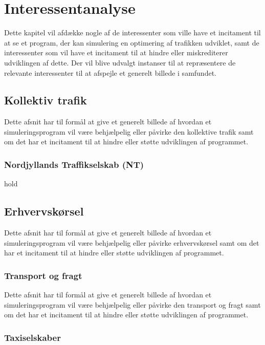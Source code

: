
\chapter{Interessentanalyse}

Dette kapitel vil afdække nogle af de interessenter som ville have et incitament til at se et program, der kan simulering en optimering af trafikken udviklet, samt de interessenter som vil have et incitament til at hindre eller miskrediterer udviklingen af dette. Der vil blive udvalgt instanser til at repræsentere de relevante interessenter til at afspejle et generelt billede i samfundet.

\section{Kollektiv trafik}

Dette afsnit har til formål at give et generelt billede af hvordan et simuleringsprogram vil være behjælpelig eller påvirke den kollektive trafik samt om det har et incitament til at hindre eller støtte udviklingen af programmet.

\subsection{Nordjyllands Traffikselskab (NT)}

hold

\section{Erhvervskørsel}

Dette afsnit har til formål at give et generelt billede af hvordan et simuleringsprogram vil være behjælpelig eller påvirke erhvervskørsel samt om det har et incitament til at hindre eller støtte udviklingen af programmet.

\subsection{Transport og fragt}

Dette afsnit har til formål at give et generelt billede af hvordan et simuleringsprogram vil være behjælpelig eller påvirke den transport og fragt samt om det har et incitament til at hindre eller støtte udviklingen af programmet.

\subsection{Taxiselskaber}

